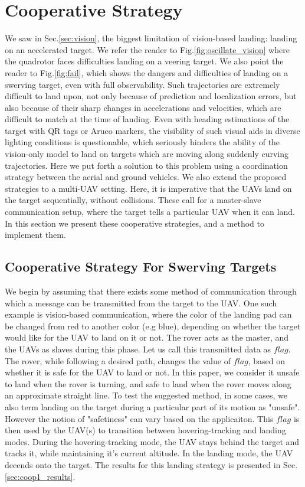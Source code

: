 \documentclass[conf]{new-aiaa}
\begin{document}
\section{Cooperative Strategy}\label{sec:coop}
We saw in Sec.\ref{sec:vision}, the biggest limitation of vision-based landing: landing on an accelerated target. We refer the reader to Fig.\ref{fig:oscillate_vision} where the quadrotor faces difficulties landing on a veering target. We also point the reader to Fig.\ref{fig:fail}, which shows the dangers and difficulties of landing on a swerving target, even with full observability. Such trajectories are extremely difficult to land upon, not only because of prediction and localization errors, but also because of their sharp changes in accelerations and velocities, which are difficult to match at the time of landing. Even with heading estimations of the target with QR tags or Aruco markers, the visibility of such visual aids in diverse lighting conditions is questionable, which seriously hinders the ability of the vision-only model to land on targets which are moving along suddenly curving trajectories. Here we put forth a solution to this problem using a coordination strategy between the aerial and ground vehicles. We also extend the proposed strategies to a multi-UAV setting. Here, it is imperative that the UAVs land on the target sequentially, without collisions. These call for a master-slave communication setup, where the target tells a particular UAV when it can land. In this section we present these cooperative strategies, and a method to implement them.
\subsection{Cooperative Strategy For Swerving Targets}\label{sec:coop1}
We begin by assuming that there exists some method of communication through which a message can be transmitted from the target to the UAV. One such example is vision-based communication, where the color of the landing pad can be changed from red to another color (e.g blue), depending on whether the target would like for the UAV to land on it or not. The rover acts as the master, and the UAVs as slaves during this phase. Let us call this transmitted data as $flag$. The rover, while following a desired path, changes the value of $flag$, based on whether it is safe for the UAV to land or not. In this paper, we consider it unsafe to land when the rover is turning, and safe to land when the rover moves along an approximate straight line. To test the suggested method, in some cases, we also term landing on the target during a particular part of its motion as "unsafe". However the notion of "safetiness" can vary based on the applicaiton. This $flag$ is then used by the UAV(s) to transition between hovering-tracking and landing modes. During the hovering-tracking mode, the UAV stays behind the target and tracks it, while maintaining it's current altitude. In the landing mode, the UAV decends onto the target. The results for this landing strategy is presented in Sec.\ref{sec:coop1_results}.
\end{document}
